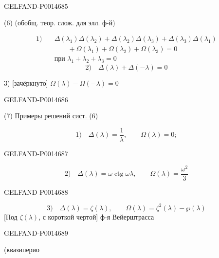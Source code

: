 \begin{GelfandAdjacentEvidence}{GELFAND-P001468}{5}


(6) 
\quad (обобщ. теор. слож. для элл. ф-й)

\[
\begin{aligned}
1)\quad &\Delta(\lambda_1)\Delta(\lambda_2)+\Delta(\lambda_2)\Delta(\lambda_3)
+\Delta(\lambda_3)\Delta(\lambda_1)\\
&\qquad +\Omega(\lambda_1)+\Omega(\lambda_2)+\Omega(\lambda_3)=0\\
&\text{при }\lambda_1+\lambda_2+\lambda_3=0
\end{aligned}
\]
\[
2)\quad \Delta(\lambda)+\Delta(-\lambda)=0
\]

3) [зачёркнуто] \(\Omega(\lambda)-\Omega(-\lambda)=0\)
\end{GelfandAdjacentEvidence}
\begin{GelfandAdjacentEvidence}{GELFAND-P001468}{6}


(7) \uline{Примеры решений сист. (6)}

\[
1)\quad \Delta(\lambda)=\frac1\lambda,\qquad \Omega(\lambda)=0;
\]
\end{GelfandAdjacentEvidence}
\begin{GelfandAdjacentEvidence}{GELFAND-P001468}{7}


\[
2)\quad \Delta(\lambda)=\omega\operatorname{ctg}\omega\lambda,\qquad
\Omega(\lambda)=\frac{\omega^2}{3}
\]
\end{GelfandAdjacentEvidence}
\begin{GelfandAdjacentEvidence}{GELFAND-P001468}{8}


\[
3)\quad \Delta(\lambda)=\zeta(\lambda),\qquad \Omega(\lambda)=\zeta^2(\lambda)-\wp(\lambda)
\]
[Под \(\zeta(\lambda)\), с короткой чертой] ф-я Вейерштрасса
\end{GelfandAdjacentEvidence}
\begin{GelfandAdjacentEvidence}{GELFAND-P001468}{9}


(квазиперио
\end{GelfandAdjacentEvidence}



